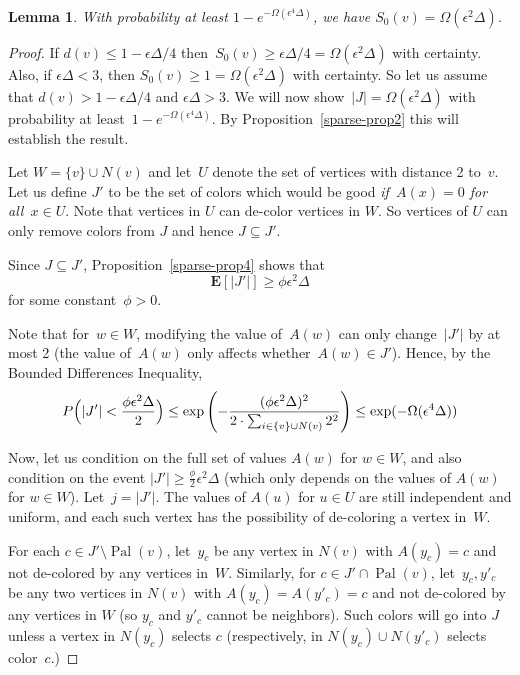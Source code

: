\documentclass[11pt]{amsart}
\newtheorem{lemma}[theorem]{Lemma}
\newcommand{\bE}{\ensuremath{\mathbf{E}}}
\newcommand{\pal}{\operatorname{Pal}}
\begin{document}
\begin{lemma}
\label{sparse-conc-prop}
With probability at least $1 - e^{-\Omega(\epsilon^4 \Delta)}$, we have $S_0(v) = \Omega(\epsilon^2 \Delta)$.
\end{lemma}
\begin{proof}
If $d(v) \leq 1 - \epsilon \Delta/4$ then~$S_0(v) \geq \epsilon \Delta/4 = \Omega(\epsilon^2 \Delta)$ with certainty. Also, if $\epsilon \Delta < 3$, then $S_0(v) \geq 1 = \Omega(\epsilon^2 \Delta)$ with certainty. So let us assume that $d(v) > 1 - \epsilon \Delta/4$ and $\epsilon \Delta > 3$. We will now show~$|J| = \Omega(\epsilon^2 \Delta)$ with probability at least~$1-e^{-\Omega(\epsilon^4\Delta)}$. By Proposition~\ref{sparse-prop2} this will establish the result.

Let $W = \{v\} \cup N(v)$ and let~$U$ denote the set of vertices with distance 2 to~$v$. Let us define $J'$ to be the set of colors which would be good \emph{if~$A(x) = 0$ for all~$x \in U$}. Note that vertices in $U$ can de-color vertices in $W$. So vertices of $U$ can only remove colors from $J$ and hence  $J \subseteq J'$.

Since $J \subseteq J'$, Proposition~\ref{sparse-prop4} shows that 
$$
\bE[|J'|] \geq \phi \epsilon^2 \Delta
$$
for some constant~$\phi > 0$. 

Note that for~$w \in W$, modifying the value of~$A(w)$ can only change~$|J'|$ by at most 2 (the value of~$A(w)$ only affects whether~$A(w) \in J'$). Hence, by the Bounded Differences Inequality,
$$
P \Bigl(  |J'| < \frac{\phi \epsilon^2 \Delta}{2} \Bigr) \leq \exp\left(-\frac{ (\phi \epsilon^2 \Delta)^2}{ 2 \cdot \sum_{i \in \{v \} \cup N(v)} 2^2 }\right) \leq \exp(-\Omega(\epsilon^4 \Delta))
$$

Now, let us condition on the full set of values $A(w)$ for $w \in W$, and also condition on the event $|J'| \geq \tfrac{\phi}{2} \epsilon^2 \Delta$ (which only depends on the values of $A(w)$ for $w \in W$). Let~$j = |J'|$. The values of $A(u)$ for $u \in U$ are still independent and uniform, and each such vertex has the possibility of de-coloring a vertex in~$W$.

For each $c \in J' \setminus  \pal(v)$, let~$y_c$ be any vertex in $N(v)$ with $A(y_c) = c$ and not de-colored by any vertices in~$W$. Similarly, for $c \in J' \cap \pal(v)$, let~$y_c, y'_c$ be any two vertices in $N(v)$ with $A(y_c) = A(y'_c) = c$ and not de-colored by any vertices in $W$ (so $y_c$ and $y'_c$ cannot be neighbors). Such colors will go into $J$ unless a vertex in $N(y_c)$ selects $c$ (respectively, in $N(y_c) \cup N(y'_c)$ selects color~$c$.)


\end{proof}
\end{document}
